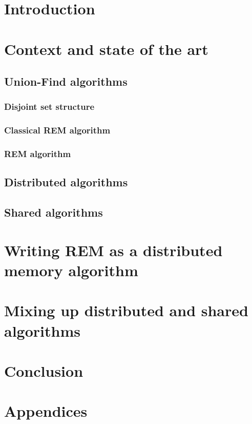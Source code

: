 \documentclass[12px]{article}
\begin{document}
  \section{Introduction}

  \section{Context and state of the art}
    \subsection{Union-Find algorithms}
      \subsubsection{Disjoint set structure}
      \subsubsection{Classical REM algorithm}
      \subsubsection{REM algorithm}

    \subsection{Distributed algorithms}

    \subsection{Shared algorithms}


  \section{Writing REM as a distributed memory algorithm}


  \section{Mixing up distributed and shared algorithms}


  \section{Conclusion}


  \section{Appendices}
\end{document}
